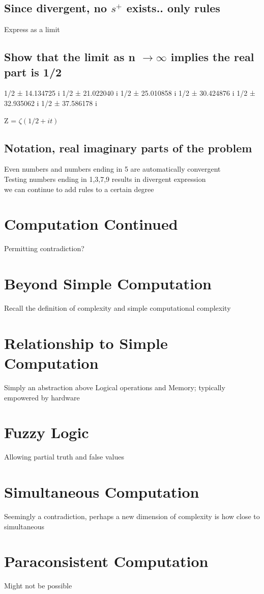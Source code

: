 \documentclass[11pt]{article}
\begin{document}
\subsection{Since divergent, no $s^{+}$ exists.. only rules}
Express as a limit

\subsection{Show that the limit as n $\rightarrow \infty$ implies the real part is 1/2}
1/2 ± 14.134725 i
1/2 ± 21.022040 i
1/2 ± 25.010858 i
1/2 ± 30.424876 i
1/2 ± 32.935062 i
1/2 ± 37.586178 i

Z = $\zeta(1/2 + it)$

\subsection{Notation, real imaginary parts of the problem}
Even numbers and numbers ending in 5 are automatically convergent\\
Testing numbers ending in 1,3,7,9 results in divergent expression\\
we can continue to add rules to a certain degree








\section*{Computation Continued}
Permitting contradiction?

\section{Beyond Simple Computation}
Recall the definition of complexity and simple computational complexity

\section{Relationship to Simple Computation}
Simply an abstraction above Logical operations and Memory; typically empowered by hardware

\section{Fuzzy Logic}
Allowing partial truth and false values

\section{Simultaneous Computation}
Seemingly a contradiction, perhaps a new dimension of complexity is how close to simultaneous

\section{Paraconsistent Computation}
Might not be possible
\end{document}
